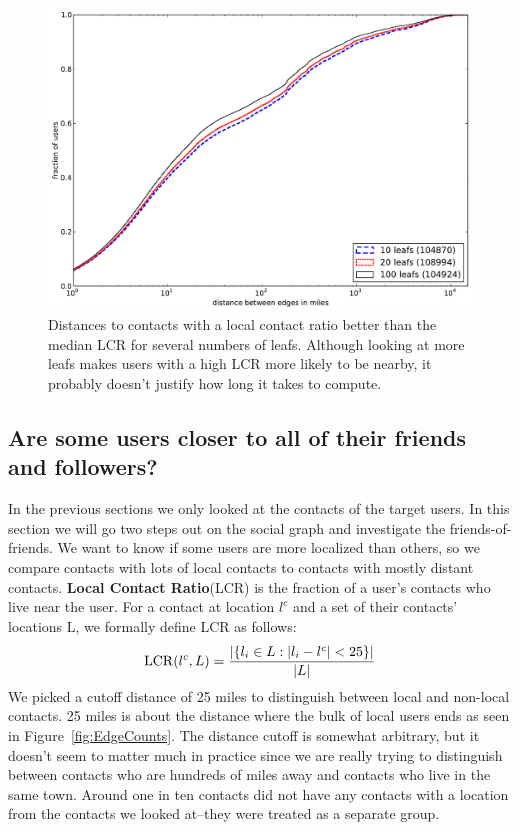 \documentclass[letterpaper]{article}
\DeclareMathOperator{\LCR}{LCR}
\newcommand{\flsec}[1]{\subsection{#1}}
\begin{document}
\begin{figure}[tbh]
\centering
\includegraphics[width=\linewidth]{figures/locals_cmp.pdf}
\caption{
    Distances to contacts with a local contact ratio better than the median LCR
    for several numbers of leafs.
    Although looking at more leafs makes users with a high LCR more likely to
    be nearby, it probably doesn't justify how long it takes to compute.
}
\label{fig:LocalCmp}
\end{figure}

\flsec{Are some users closer to all of their friends and followers?}
\label{sec:closer}

In the previous sections we only looked at the contacts of the target
users.
%
In this section we will go two steps out on the social graph and
investigate the friends-of-friends.
%
We want to know if some users are more localized than others, so we compare
contacts with lots of local contacts to contacts with mostly distant contacts.
%
\textbf{Local Contact Ratio}(LCR) is the fraction of a user's contacts
who live near the user.
%
For a contact at location $l^c$ and a set of their contacts' locations L, we
formally define LCR as follows:
\[
    \LCR(l^c,L) = { |\{ l_i \in L : |l_i-l^c|<25 \}|
                    \over |L| }
\]
%
We picked a cutoff distance of 25 miles to distinguish between local and non-local
contacts.
25 miles is about the distance where the bulk of local users ends as seen in
Figure~\ref{fig:EdgeCounts}.
%
The distance cutoff is somewhat arbitrary, but it doesn't seem to matter much
in practice since we are really trying to distinguish between contacts who are
hundreds of miles away and contacts who live in the same town.
%
Around one in ten contacts did not have any contacts with a location from the
contacts we looked at--they were treated as a separate group.
\end{document}
